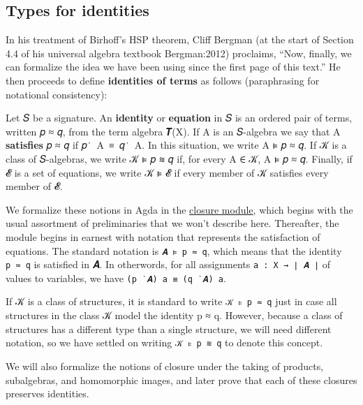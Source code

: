 \documentclass[sigplan,screen]{acmart}
\newcommand\closuremodule{\href{https://gitlab.com/ualib/ualib.gitlab.io/-/blob/master/congruences.lagda.rst}{closure module}\xspace}
\newcommand\closuremodule{\href{anonymizedLink/congruences.lagda.rst}{closure module}\xspace}
\begin{document}
\subsection{Types for identities}\label{types-for-identities}
In his treatment of Birhoff's HSP theorem, Cliff Bergman (at the start of Section 4.4 of his universal algebra textbook Bergman:2012) proclaims, ``Now, finally, we can formalize the idea we have been using since the first page of this text.'' He then proceeds to define \textbf{identities of terms} as follows (paraphrasing for notational consistency):

Let 𝑆 be a signature. An \textbf{identity} or \textbf{equation} in 𝑆 is an ordered pair of terms, written 𝑝 ≈ 𝑞, from the term algebra 𝑻(X). If A is an 𝑆-algebra we say that A \textbf{satisfies} 𝑝 ≈ 𝑞 if 𝑝~̇~A~≡~𝑞~̇~A. In this situation, we write A ⊧ 𝑝 ≈ 𝑞.
If 𝒦 is a class of 𝑆-algebras, we write 𝒦 ⊧ 𝑝 ≋ 𝑞 if, for every A ∈ 𝒦, A ⊧ 𝑝 ≈ 𝑞. Finally, if 𝓔 is a set of equations, we write 𝒦 ⊧ 𝓔 if every member of 𝒦 satisfies every member of 𝓔.

We formalize these notions in Agda in the \closuremodule, which begins with the usual assortment of preliminaries that we won't describe here.  Thereafter, the module begins in earnest with
notation that represents the satisfaction of equations. The standard notation is \texttt{𝑨\ ⊧\ p\ ≈\ q}, which means that the identity \texttt{p\ ≈\ q} is satisfied in 𝑨. In otherwords, for all assignments \texttt{a\ :\ X\ →\ ∣\ 𝑨\ ∣} of values to variables, we have \texttt{(p\ ̇\ 𝑨)\ a\ ≡\ (q\ ̇\ 𝑨)\ a}.

If 𝒦 is a class of structures, it is standard to write \texttt{𝒦\ ⊧\ p\ ≈\ q} just in case all structures in the class 𝒦 model the identity p ≈ q. However, because a class of structures has a different type than a single structure, we will need different notation, so we have settled on writing \texttt{𝒦\ ⊧\ p\ ≋\ q} to denote this concept.

We will also formalize the notions of closure under the taking of products, subalgebras, and homomorphic images, and later prove that each of these closures preserves identities.
\begin{code}\end{code}
\end{document}
